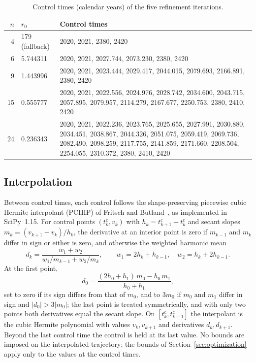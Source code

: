 \documentclass[11pt]{article}
\newcommand{\tc}{t^{\mathrm{c}}}
\begin{document}
\begin{table}[ht]
\centering
\caption{Control times (calendar years) of the five refinement iterations.}
\label{tab:control-times}
\small
\begin{tabular}{r l p{}}
\toprule
$n$ & $r_0$ & Control times \\
\midrule
4 & 179 (fallback) & 2020, 2021, 2380, 2420 \\
6 & 5.744311 & 2020, 2021, 2027.744, 2073.230, 2380, 2420 \\
9 & 1.443996 & 2020, 2021, 2023.444, 2029.417, 2044.015, 2079.693,
  2166.891, 2380, 2420 \\
15 & 0.555777 & 2020, 2021, 2022.556, 2024.976, 2028.742, 2034.600, 2043.715,
  2057.895, 2079.957, 2114.279, 2167.677, 2250.753, 2380, 2410, 2420 \\
24 & 0.236343 & 2020, 2021, 2022.236, 2023.765, 2025.655, 2027.991, 2030.880,
  2034.451, 2038.867, 2044.326, 2051.075, 2059.419, 2069.736, 2082.490,
  2098.259, 2117.755, 2141.859, 2171.660, 2208.504, 2254.055, 2310.372, 2380,
  2410, 2420 \\
\bottomrule
\end{tabular}
\end{table}

\subsection{Interpolation}
\label{sec:pchip}

Between control times, each control follows the shape-preserving piecewise
cubic Hermite interpolant (PCHIP) of Fritsch and
Butland~\cite{FritschCarlson1980,FritschButland1984}, as implemented in
SciPy~1.15. For control points $(\tc_k, v_k)$ with $h_k = \tc_{k+1}-\tc_k$
and secant slopes $m_k = (v_{k+1}-v_k)/h_k$, the derivative at an interior
point is zero if $m_{k-1}$ and $m_k$ differ in sign or either is zero, and
otherwise the weighted harmonic mean
\begin{equation}
  d_k = \frac{w_1 + w_2}{w_1/m_{k-1} + w_2/m_k}, \qquad
  w_1 = 2h_k + h_{k-1},\quad w_2 = h_k + 2h_{k-1}.
\end{equation}
At the first point,
\begin{equation}
  d_0 = \frac{(2h_0 + h_1)\,m_0 - h_0\,m_1}{h_0 + h_1},
\end{equation}
set to zero if its sign differs from that of $m_0$, and to $3m_0$ if $m_0$
and $m_1$ differ in sign and $|d_0| > 3|m_0|$; the last point is treated
symmetrically, and with only two points both derivatives equal the secant
slope. On $[\tc_k,\tc_{k+1}]$ the interpolant is the cubic Hermite
polynomial with values $v_k, v_{k+1}$ and derivatives $d_k, d_{k+1}$. Beyond
the last control time the control is held at its last value. No bounds are
imposed on the interpolated trajectory; the bounds of
Section~\ref{sec:optimization} apply only to the values at the control times.
\end{document}
